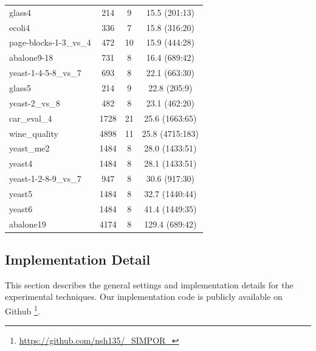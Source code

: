 {\begin{table}[htbp]
\begin{tabular}{lccc}
		glass4 & 214   & 9     & 15.5 (201:13)\\
		ecoli4 & 336   & 7     & 15.8 (316:20)\\
		page-blocks-1-3\_vs\_4 & 472   & 10    & 15.9 (444:28)\\
		abalone9-18 & 731   & 8     & 16.4 (689:42)\\
		yeast-1-4-5-8\_vs\_7 & 693   & 8     & 22.1 (663:30)\\
		glass5 & 214   & 9     & 22.8 (205:9)\\
		yeast-2\_vs\_8 & 482   & 8     & 23.1 (462:20)\\
		car\_eval\_4 & 1728  & 21    & 25.6 (1663:65)\\
		wine\_quality & 4898  & 11    & 25.8 (4715:183)\\
		yeast\_me2 & 1484  & 8     & 28.0 (1433:51)\\
		yeast4 & 1484  & 8     & 28.1 (1433:51)\\
		yeast-1-2-8-9\_vs\_7 & 947   & 8     & 30.6 (917:30)\\
		yeast5 & 1484  & 8     & 32.7 (1440:44)\\
		yeast6 & 1484  & 8     & 41.4 (1449:35)\\
		abalone19 & 4174  & 8     & 129.4 (689:42)\\
	\end{tabular}%
	\label{tab:dataDecription}%
\end{table}%
}


\subsection{Implementation Detail}
This section describes the general settings and implementation details for the experimental techniques. Our implementation code is publicly available on Github \footnote{\url{https://github.com/nsh135/_SIMPOR_}}.  


